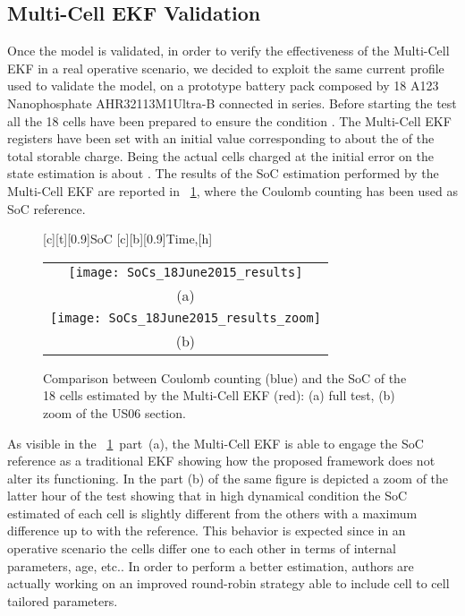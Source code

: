 \documentclass[journal]{IEEEtran}
\begin{document}
\subsection{Multi-Cell EKF Validation}
Once the model is validated, in order to verify the effectiveness of the Multi-Cell EKF in a real operative scenario, we decided to exploit the same current profile used to validate the model, on a prototype battery pack composed by 18 A123 Nanophosphate AHR32113M1Ultra-B connected in series. Before starting the test all the 18 cells have been prepared to ensure the condition .
The Multi-Cell EKF registers have been set with an initial  value corresponding to about the  of the total storable charge. Being the actual cells charged at  the initial error on the state estimation is about .
The results of the SoC estimation performed by the Multi-Cell EKF are reported in \figurename~\ref{fig::soc_initial_100_parallel}, where the Coulomb counting has been used as SoC reference.
\begin{figure}[htbph]
\centering
{}[c][t][0.9]{\scriptsize{SoC}}
[c][b][0.9]{\scriptsize{Time,[h]}}
\begin{tabular}{c}
\texttt{[image: SoCs\_18June2015\_results]} \\ 
(a)\\
\texttt{[image: SoCs\_18June2015\_results\_zoom]} \\
(b)\\
\end{tabular}
\caption{Comparison between Coulomb counting (blue) and the SoC of the 18 cells estimated by the Multi-Cell EKF (red): (a) full test, (b) zoom of the US06 section.}
\label{fig::soc_initial_100_parallel}    
\end{figure}
As visible in the \figurename~\ref{fig::soc_initial_100_parallel}~part~(a), the Multi-Cell EKF is able to engage the SoC reference as a traditional EKF showing how the proposed framework does not alter its functioning. In the part (b) of the same figure is depicted a zoom of the latter hour of the test showing that in high dynamical condition the SoC estimated of each cell is slightly different from the others with a maximum difference up to  with the reference.
This behavior is expected since in an operative scenario the cells differ one to each other in terms of internal parameters, age, etc..
In order to perform a better estimation, authors are actually working on an improved round-robin strategy able to include cell to cell tailored parameters. 
\end{document}
